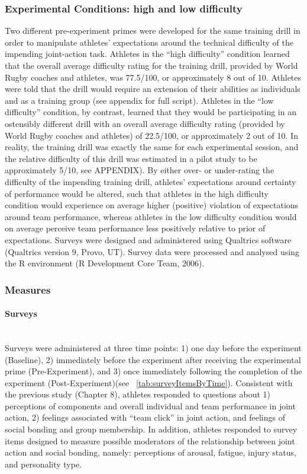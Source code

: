 \documentclass[english]{article}\usepackage[]{graphicx}\usepackage[]{color}
\newcommand{\myparagraph}[1]{\paragraph{#1}\mbox{}\\}
\begin{document}
\subsubsection{Experimental Conditions: high and low difficulty}
Two different pre-experiment primes were developed for the same training drill in order to manipulate athletes’ expectations around the technical difficulty of the impending joint-action task.  Athletes in the ``high difficulty'' condition learned that the overall average difficulty rating for the training drill, provided by World Rugby coaches and athletes, was 77.5/100, or approximately 8 out of 10.  Athletes were told that the drill would require an extension of their abilities as individuals and as a training group (see appendix for full script).  Athletes in the ``low difficulty'' condition, by contrast, learned that they would be participating in an ostensibly different drill with an overall average difficulty rating (provided by World Rugby coaches and athletes) of 22.5/100, or approximately 2 out of 10.  In reality, the training drill was exactly the same for each experimental session, and the relative difficulty of this drill was estimated in a pilot study to be approximately 5/10, see APPENDIX).  By either over- or under-rating the difficulty of the impending training drill, athletes' expectations around certainty of performance would be altered, such that athletes in the high difficulty condition would experience on average higher (positive) violation of expectations around team performance, whereas athletes in the low difficulty condition would on average perceive team performance less positively relative to prior of expectations. Surveys were designed and administered using Qualtrics software (Qualtrics version 9, Provo, UT). Survey data were processed and analysed using the R environment (R Development Core Team, 2006).


\subsubsection{Measures}

\myparagraph{Surveys}
Surveys were administered at three time points: 1) one day before the experiment (Baseline), 2) immediately before the experiment after receiving the experimental prime (Pre-Experiment), and 3) once immediately following the completion of the experiment (Post-Experiment)(see ~\ref{tab:surveyItemsByTime}).  Consistent with the previous study (Chapter 8), athletes responded to questions about 1) perceptions of components and overall individual and team performance in joint action, 2) feelings associated with ``team click'' in joint action, and feelings of social bonding and group membership.  In addition, athletes responded to survey items designed to measure possible moderators of the relationship between joint action and social bonding, namely: perceptions of arousal, fatigue, injury status, and personality type.
\end{document}

